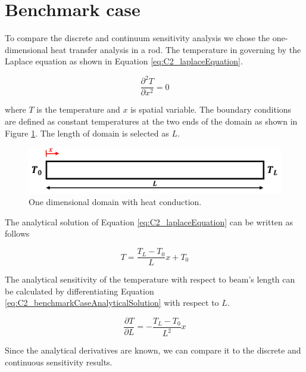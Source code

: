 \section{Benchmark case}
To compare the discrete and continuum sensitivity analysis we chose the one-dimensional heat transfer analysis in a rod. The temperature in governing by the Laplace equation as shown in Equation \eqref{eq:C2_laplaceEquation}.

\begin{equation}\label{eq:C2_laplaceEquation}
	\frac{\partial^2 T}{\partial x^2} = 0
\end{equation}

where $T$ is the temperature and $x$ is spatial variable. The boundary conditions are defined as constant temperatures at the two ends of the domain as shown in Figure \ref{fig:C2_benchmarkCase}. The length of domain is selected as $L$.

\begin{figure}[h]
	\centering
	\includegraphics[width=14.00cm]{Chapter_2/figure/benchmark_case.png}
	\caption{One dimensional domain with heat conduction.}
	\label{fig:C2_benchmarkCase}
\end{figure}

The analytical solution of Equation \eqref{eq:C2_laplaceEquation} can be written as follows

\begin{equation}\label{eq:C2_benchmarkCaseAnalyticalSolution}
	T = \frac{T_L - T_0}{L} x + T_0
\end{equation}

The analytical sensitivity of the temperature with respect to beam's length can be calculated by differentiating Equation \eqref{eq:C2_benchmarkCaseAnalyticalSolution} with respect to $L$.

\begin{equation}
	\frac{\partial T}{\partial L} = -\frac{T_L - T_0}{L^2} x
\end{equation}

Since the analytical derivatives are known, we can compare it to the discrete and continuous sensitivity results.

